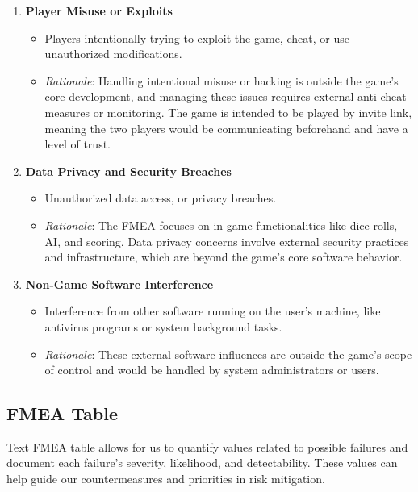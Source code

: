 \documentclass{article}
\begin{document}
\begin{enumerate}
    \item \textbf{Player Misuse or Exploits}
        \begin{itemize}
            \item Players intentionally trying to exploit the game, cheat, or use unauthorized modifications.
            \item \textit{Rationale}: Handling intentional misuse or hacking is outside the game's core development, and managing these issues requires external anti-cheat measures or monitoring. The game is intended to be played by invite link, meaning the two players would be communicating beforehand and have a level of trust.
        \end{itemize}

    \item \textbf{Data Privacy and Security Breaches}
        \begin{itemize}
            \item Unauthorized data access, or privacy breaches.
            \item \textit{Rationale}: The FMEA focuses on in-game functionalities like dice rolls, AI, and scoring. Data privacy concerns involve external security practices and infrastructure, which are beyond the game's core software behavior.
        \end{itemize}

    \item \textbf{Non-Game Software Interference}
        \begin{itemize}
            \item Interference from other software running on the user's machine, like antivirus programs or system background tasks.
            \item \textit{Rationale}: These external software influences are outside the game's scope of control and would be handled by system administrators or users.
        \end{itemize}

\end{enumerate}

\subsection{FMEA Table}

Text FMEA table allows for us to quantify values related to possible failures and document each failure's severity, likelihood, and detectability. These values can help guide our countermeasures and priorities in risk mitigation.
\end{document}
